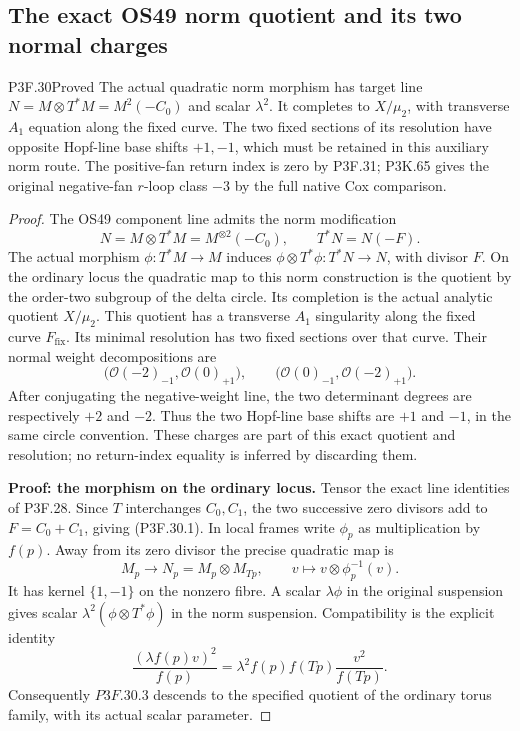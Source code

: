 \subsection{The exact OS49 norm quotient and its two normal charges}
\begin{statement}{P3F.30}{Proved}
The actual quadratic norm morphism has target line $N=M\otimes T^*M=M^2(-C_0)$ and scalar $\lambda^2$. It completes to $X/\mu_2$, with transverse $A_1$ equation along the fixed curve. The two fixed sections of its resolution have opposite Hopf-line base shifts $+1,-1$, which must be retained in this auxiliary norm route. The positive-fan return index is zero by P3F.31; P3K.65 gives the original negative-fan \(r\)-loop class \(-3\) by the full native Cox comparison.
\end{statement}
\begin{proof}
The OS49 component line admits the norm modification \[
 N=M\otimes T^*M=M^{\otimes2}(-C_0),
 \qquad T^*N=N(-F).                                  \tag{P3F.30.1}
\] The actual morphism \(\phi:T^*M\to M\) induces \(\phi\otimes T^*\phi:T^*N\to N\), with divisor \(F\). On the ordinary locus the quadratic map to this norm construction is the quotient by the order-two subgroup of the delta circle. Its completion is the actual analytic quotient \(X/\mu_2\). This quotient has a transverse \(A_1\) singularity along the fixed curve \(F_{\mathrm{fix}}\). Its minimal resolution has two fixed sections over that curve. Their normal weight decompositions are \[
 \bigl(\mathcal O(-2)_{-1},\mathcal O(0)_{+1}\bigr),
 \qquad
 \bigl(\mathcal O(0)_{-1},\mathcal O(-2)_{+1}\bigr).
                                                               \tag{P3F.30.2}
\] After conjugating the negative-weight line, the two determinant degrees are respectively \(+2\) and \(-2\). Thus the two Hopf-line base shifts are \(+1\) and \(-1\), in the same circle convention. These charges are part of this exact quotient and resolution; no return-index equality is inferred by discarding them.

\textbf{Proof: the morphism on the ordinary locus.} Tensor the exact line identities of P3F.28. Since \(T\) interchanges \(C_0,C_1\), the two successive zero divisors add to \(F=C_0+C_1\), giving (P3F.30.1). In local frames write \(\phi_p\) as multiplication by \(f(p)\). Away from its zero divisor the precise quadratic map is \[
 M_p\longrightarrow N_p=M_p\otimes M_{Tp},
 \qquad v\longmapsto v\otimes\phi_p^{-1}(v).
                                                               \tag{P3F.30.3}
\] It has kernel \(\{1,-1\}\) on the nonzero fibre. A scalar \(\lambda\phi\) in the original suspension gives scalar \(\lambda^2(\phi\otimes T^*\phi)\) in the norm suspension. Compatibility is the explicit identity \[
 \frac{(\lambda f(p)v)^2}{f(p)}
 =\lambda^2 f(p)f(Tp)\frac{v^2}{f(Tp)}.
\] Consequently \(P3F.30.3\) descends to the specified quotient of the ordinary torus family, with its actual scalar parameter.


\end{proof}
